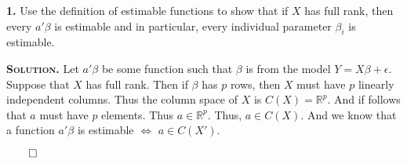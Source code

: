 \documentclass{article}
\begin{document}
\setlength{\parindent}{0cm}   %



\textbf{1.} Use the definition of estimable functions to show that if \(X\) has full rank, then every \(a'\beta\) is estimable and in particular, every individual parameter \(\beta_i\) is estimable. 


\vspace{5mm}
\textbf{\textsc{ Solution.}} Let \(a'\beta\) be some function such that \(\beta\) is from the model \(Y=X\beta + \epsilon\). Suppose that \(X\) has full rank. Then if \(\beta\) has \(p\) rows, then \(X\) must have \(p \) linearly independent columns. Thus the column space of \(X\) is \(C(X) = \mathbb{R}^p\). And if follows that \(a\) must have \(p\) elements. Thus \(a\in\mathbb{R}^p\). Thus, \(a \in C(X)\). And we know that a function \(a'\beta\) is estimable \(\iff\) \(a \in C(X')\). 

\begin{flushright}
\(\qed\)\end{flushright}
\end{document}
